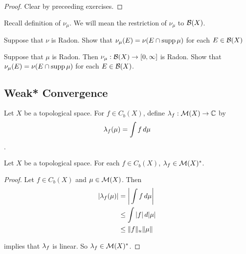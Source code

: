 \documentclass{book}
\begin{document}
	\begin{proof}
		Clear by preceeding exercises.
	\end{proof}


	\begin{note}
		Recall definition of $\nu_\mu$. We will mean the restriction of $\nu_{\mu}$ to $\mathcal{B}(X)$.
	\end{note}

	\begin{ex}
		Suppose that $\nu$ is Radon. Show that $\nu_{\mu}(E) = \nu(E \cap \operatorname{supp} \mu)$ for each $E \in \mathcal{B}(X)$
	\end{ex}


	\begin{ex}
		Suppose that $\mu$ is Radon. Then $\nu_{\mu}: \mathcal{B}(X) \rightarrow [0,\infty]$ is Radon. Show that $\nu_{\mu}(E) = \nu(E \cap \operatorname{supp} \mu)$ for each $E \in \mathcal{B}(X)$. 
	\end{ex}








	
	
	
	
	
	
	
	
	
	
	
	
	
	
	
	
	
	
	
	
	
	
	
	
	
	
	
	\newpage	
	\subsection{Weak* Convergence}
	\begin{defn}
		Let $X$ be a topological space. For $f \in C_b(X)$, define $\lambda_f: \mathcal{M}(X) \rightarrow \mathbb{C}$ by $$\lambda_f(\mu) = \int f \, d \mu$$.
	\end{defn}
	
	\begin{ex}
		Let $X$ be a topological space. For each $f \in C_b(X)$, $\lambda_f \in \mathcal{M}(X)^*$. 
	\end{ex}
	
	\begin{proof}
		Let $f \in C_b(X)$ and $\mu \in \mathcal{M}(X)$. Then 
		\begin{align*}
			|\lambda_f(\mu)| 
			&= \bigg | \int f \, d \mu \bigg| \\
			&\leq \int |f| \, d |\mu| \\
			& \leq \|f\|_u \|\mu\|
		\end{align*}
		
		 implies that $\lambda_f$ is linear. So $\lambda_f \in \mathcal{M}(X)^*$.
	\end{proof}
	
\end{document}
